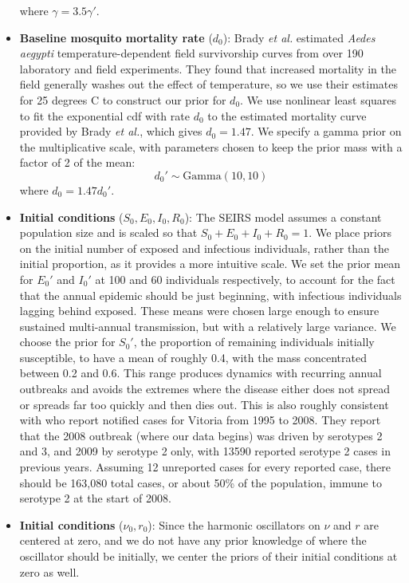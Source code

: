 \documentclass[12pt,letterpaper]{article}
\begin{document}
\begin{itemize}
where $\gamma = 3.5\gamma'$.
\\
\item \textbf{Baseline mosquito mortality rate} ($d_0$): Brady \textit{et al.} \cite{Brady2013} estimated \textit{Aedes aegypti} temperature-dependent field survivorship curves from over 190 laboratory and field experiments.
They found that increased mortality in the field generally washes out the effect of temperature, so we use their estimates for 25 degrees C to construct our prior for $d_0$.  
We use nonlinear least squares to fit the exponential cdf with rate $d_0$ to the estimated mortality curve provided by Brady \textit{et al.}, which gives $d_0 = 1.47$.
We specify a gamma prior on the multiplicative scale, with parameters chosen to keep the prior mass with a factor of 2 of the mean:
\begin{equation}
d_0' \sim \text{Gamma}(10, 10)
\end{equation}
where $d_0 = 1.47d_0'$.
\\
\item \textbf{Initial conditions} ($S_0, E_0, I_0, R_0$): The SEIRS model assumes a constant population size and is scaled so that $S_0+E_0+I_0+R_0 = 1$.
We place priors on the initial number of exposed and infectious individuals, rather than the initial proportion, as it provides a more intuitive scale.
We set the prior mean for $E_0'$ and $I_0'$ at 100 and 60 individuals respectively, to account for the fact that the annual epidemic should be just beginning, with infectious individuals lagging behind exposed.
These means were chosen large enough to ensure sustained multi-annual transmission, but with a relatively large variance.
We choose the prior for $S_0'$, the proportion of remaining individuals initially susceptible, to have a mean of roughly  0.4, with the mass concentrated between 0.2 and 0.6.
This range produces dynamics with recurring annual outbreaks and avoids the extremes where the disease either does not spread or spreads far too quickly and then dies out.
This is also roughly consistent with \cite{Cardoso2011a} who report notified cases for Vitoria from 1995 to 2008. 
They report that the 2008 outbreak (where our data begins) was driven by serotypes 2 and 3, and 2009 by serotype 2 only, with 13590 reported serotype 2 cases in previous years.
Assuming 12 unreported cases for every reported case, there should be 163,080 total cases, or about 50\% of the population, immune to serotype 2 at the start of 2008.
\\
\item \textbf{Initial conditions} ($\nu_0, r_0$): Since the harmonic oscillators on $\nu$ and $r$ are centered at zero, and we do not have any prior knowledge of where the oscillator should be initially, we center the priors of their initial conditions at zero as well.  

\end{itemize}
\end{document}
